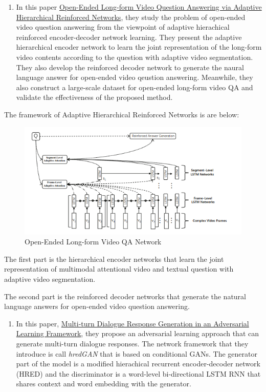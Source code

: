 \documentclass[]{book}
\providecommand{\tightlist}{%
  \setlength{\itemsep}{0pt}\setlength{\parskip}{0pt}}
\theoremstyle{definition}
\theoremstyle{definition}
\theoremstyle{definition}
\theoremstyle{remark}
\begin{document}
\begin{enumerate}
\def\labelenumi{\arabic{enumi}.}
\setcounter{enumi}{1}
\tightlist
\item
  In this paper
  \href{https://www.ijcai.org/proceedings/2018/0512.pdf}{Open-Ended
  Long-form Video Question Answering via Adaptive Hierarchical
  Reinforced Networks}, they study the problem of open-ended video
  question answering from the viewpoint of adaptive hierachical
  reinforced encoder-decoder network learning. They present the adaptive
  hierarchical encoder network to learn the joint representation of the
  long-form video contents according to the question with adaptive video
  segmentation. They also develop the reinforced decoder network to
  generate the naural language answer for open-ended video qeustion
  answering. Meanwhile, they also construct a large-scale dataset for
  open-ended long-form video QA and validate the effectiveness of the
  proposed method.
\end{enumerate}

The framework of Adaptive Hierarchical Reinforced Networks is are below:

\begin{figure}
\centering
\includegraphics{img/oe.png}
\caption{Open-Ended Long-form Video QA Network}
\end{figure}

The first part is the hierarchical encoder networks that learn the joint
representation of multimodal attentional video and textual question with
adaptive video segmentation.

The second part is the reinforced decoder networks that generate the
natural language answers for open-ended video question answering.

\begin{enumerate}
\def\labelenumi{\arabic{enumi}.}
\setcounter{enumi}{2}
\tightlist
\item
  In this paper, \href{https://arxiv.org/pdf/1805.11752.pdf}{Multi-turn
  Dialogue Response Generation in an Adversarial Learning Framework},
  they propose an adversarial learning approach that can generate
  multi-turn dialogue responses. The network framework that they
  introduce is call \emph{hredGAN} that is based on conditional GANs.
  The generator part of the model is a modified hierachical recurrent
  encoder-decoder network (HRED) and the discriminator is a word-level
  bi-directional LSTM RNN that shares context and word embedding with
  the generator.
\end{enumerate}
\end{document}
